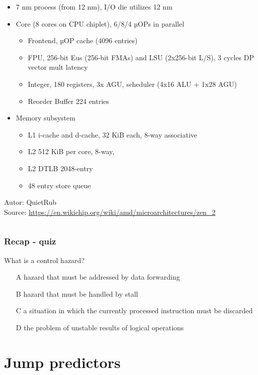 \documentclass{beamer}
\begin{document}
\begin{frame}
\begin{columns}[T]
\begin{column}{0.66\textwidth}
\scriptsize
\begin{itemize}
\item 7 nm process (from 12 nm), I/O die utilizes 12 nm
\item Core (8 cores on CPU chiplet), 6/8/4 µOPs in parallel
\begin{itemize}
\scriptsize
\item Frontend, µOP cache (4096 entries)
\item FPU, 256-bit Eus (256-bit FMAs) and LSU (2x256-bit L/S), 3 cycles DP vector mult latency
\item Integer, 180 registers, 3x AGU, scheduler (4x16 ALU + 1x28 AGU)
\item Reorder Buffer 224 entries
\end{itemize}
\item Memory subsystem
\begin{itemize}
\scriptsize
\item L1 i-cache and d-cache, 32 KiB each, 8-way associative
\item L2 512 KiB per core, 8-way,
\item L2 DTLB 2048-entry
\item 48 entry store queue
\end{itemize}
\end{itemize}
Autor: QuietRub\\
Source: \url{https://en.wikichip.org/wiki/amd/microarchitectures/zen_2}
\end{column}
\end{columns}

\end{frame}


\begin{frame}
\frametitle{Recap - quiz}

What is a control hazard?

\bigskip
\begin{itemize}
 \item[A] hazard that must be addressed by data forwarding
 \item[B] hazard that must be handled by stall
 \item[C] a situation in which the currently processed instruction must be discarded
 \item[D] the problem of unstable results of logical operations
\end{itemize}
\end{frame}

\section{Jump predictors}
\end{document}
